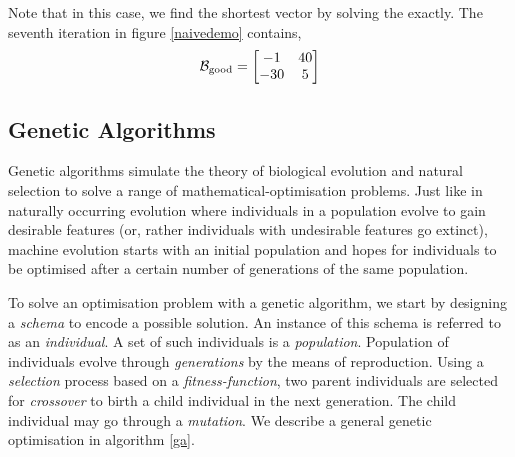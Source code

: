 \documentclass{homework}
\begin{document}
Note that in this case, we find the shortest vector by solving the
\SBP{} exactly. The seventh iteration in figure \ref{naivedemo}
contains,
\[
  \mathcal{B}_\text{good} =
  \begin{bmatrix}
    -1  & 40 \\
    -30 & 5
  \end{bmatrix}
\]

\subsection{Genetic Algorithms} Genetic algorithms simulate the theory
of biological evolution and natural selection to solve a range of
mathematical-optimisation problems. Just like in naturally occurring
evolution where individuals in a population evolve to gain desirable
features (or, rather individuals with undesirable features go
extinct), machine evolution starts with an initial population and
hopes for individuals to be optimised after a certain number of
generations of the same population.

To solve an optimisation problem with a genetic algorithm, we start by
designing a \textit{schema} to encode a possible solution. An instance
of this schema is referred to as an \textit{individual}. A set of such
individuals is a \textit{population}. Population of individuals evolve
through \textit{generations} by the means of reproduction. Using a
\textit{selection} process based on a \textit{fitness-function}, two
parent individuals are selected for \textit{crossover} to birth a
child individual in the next generation. The child individual may go
through a \textit{mutation}. We describe a general genetic
optimisation in algorithm \ref{ga}.
\end{document}
